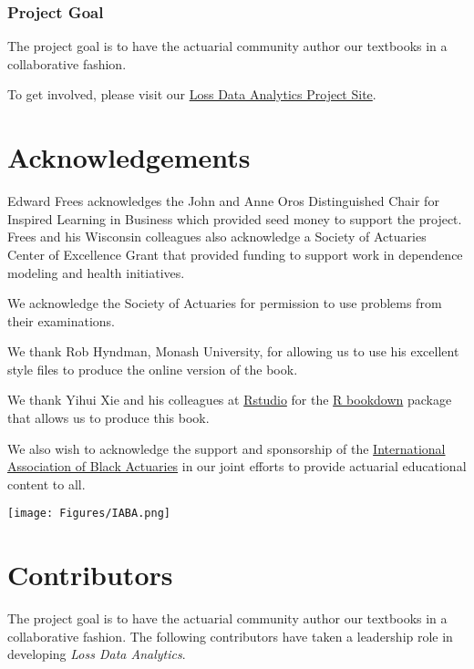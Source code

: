 \documentclass[]{book}
\theoremstyle{definition}
\theoremstyle{definition}
\theoremstyle{definition}
\theoremstyle{remark}
\begin{document}
\subsubsection*{Project Goal}\label{project-goal}

The project goal is to have the actuarial community author our textbooks
in a collaborative fashion.

To get involved, please visit our
\href{https://sites.google.com/a/wisc.edu/loss-data-analytics/}{Loss
Data Analytics Project Site}.

\section*{Acknowledgements}\label{acknowledgements}

Edward Frees acknowledges the John and Anne Oros Distinguished Chair for
Inspired Learning in Business which provided seed money to support the
project. Frees and his Wisconsin colleagues also acknowledge a Society
of Actuaries Center of Excellence Grant that provided funding to support
work in dependence modeling and health initiatives.

We acknowledge the Society of Actuaries for permission to use problems
from their examinations.

We thank Rob Hyndman, Monash University, for allowing us to use his
excellent style files to produce the online version of the book.

We thank Yihui Xie and his colleagues at
\href{https://www.rstudio.com/}{Rstudio} for the
\href{https://bookdown.org/yihui/bookdown/}{R bookdown} package that
allows us to produce this book.

We also wish to acknowledge the support and sponsorship of the
\href{http://www.blackactuaries.org/}{International Association of Black
Actuaries} in our joint efforts to provide actuarial educational content
to all.

\texttt{[image: Figures/IABA.png]}

\section*{Contributors}\label{contributors}

The project goal is to have the actuarial community author our textbooks
in a collaborative fashion. The following contributors have taken a
leadership role in developing \emph{Loss Data Analytics}.
\end{document}
